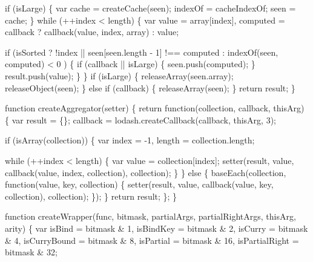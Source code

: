 \begin{DoxyCodeInclude}
      \textcolor{keywordflow}{if} (isLarge) \{
        var cache = createCache(seen);
        indexOf = cacheIndexOf;
        seen = cache;
      \}
      \textcolor{keywordflow}{while} (++index < length) \{
        var value = array[index],
            computed = callback ? callback(value, index, array) : value;

        \textcolor{keywordflow}{if} (isSorted
              ? !index || seen[seen.length - 1] !== computed
              : indexOf(seen, computed) < 0
            ) \{
          \textcolor{keywordflow}{if} (callback || isLarge) \{
            seen.push(computed);
          \}
          result.push(value);
        \}
      \}
      \textcolor{keywordflow}{if} (isLarge) \{
        releaseArray(seen.array);
        releaseObject(seen);
      \} \textcolor{keywordflow}{else} \textcolor{keywordflow}{if} (callback) \{
        releaseArray(seen);
      \}
      \textcolor{keywordflow}{return} result;
    \}

    \textcolor{keyword}{function} createAggregator(setter) \{
      \textcolor{keywordflow}{return} \textcolor{keyword}{function}(collection, callback, thisArg) \{
        var result = \{\};
        callback = lodash.createCallback(callback, thisArg, 3);

        \textcolor{keywordflow}{if} (isArray(collection)) \{
          var index = -1,
              length = collection.length;

          \textcolor{keywordflow}{while} (++index < length) \{
            var value = collection[index];
            setter(result, value, callback(value, index, collection), collection);
          \}
        \} \textcolor{keywordflow}{else} \{
          baseEach(collection, \textcolor{keyword}{function}(value, key, collection) \{
            setter(result, value, callback(value, key, collection), collection);
          \});
        \}
        \textcolor{keywordflow}{return} result;
      \};
    \}

    \textcolor{keyword}{function} createWrapper(func, bitmask, partialArgs, partialRightArgs, thisArg, arity) \{
      var isBind = bitmask & 1,
          isBindKey = bitmask & 2,
          isCurry = bitmask & 4,
          isCurryBound = bitmask & 8,
          isPartial = bitmask & 16,
          isPartialRight = bitmask & 32;


\end{DoxyCodeInclude}
